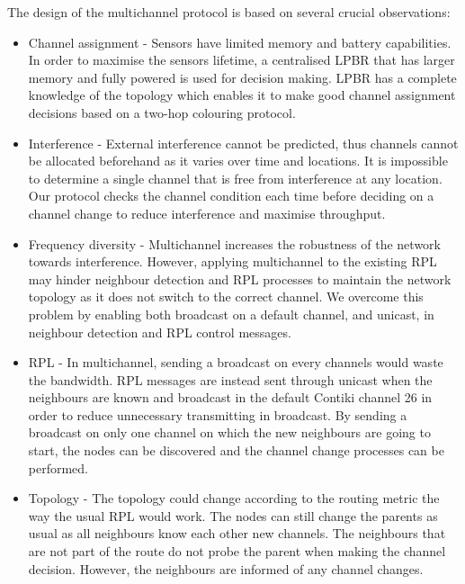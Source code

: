 The design of the multichannel protocol is based on several crucial observations:
\begin{itemize}
\item Channel assignment - Sensors have limited memory and battery capabilities. In order to maximise the sensors lifetime, a centralised LPBR that has larger memory and fully powered is used for decision making. LPBR has a complete knowledge of the topology which enables it to make good channel assignment decisions based on a two-hop colouring protocol.

\item Interference - External interference cannot be predicted, thus channels cannot be allocated beforehand as it varies over time and locations. It is impossible to determine a single channel that is free from interference at any location. Our protocol checks the channel condition each time before deciding on a channel change to reduce interference and maximise throughput.

\item Frequency diversity - Multichannel increases the robustness of the network towards interference. However, applying multichannel to the existing RPL may hinder neighbour detection and RPL processes to maintain the network topology as it does not switch to the correct channel. We overcome this problem by enabling both broadcast on a default channel, and unicast, in neighbour detection and RPL control messages. 

\item RPL - In multichannel, sending a broadcast on every channels would waste the bandwidth. RPL messages are instead sent through unicast when the neighbours are known and broadcast in the default Contiki channel 26 in order to reduce unnecessary transmitting in broadcast. By sending a broadcast on only one channel on which the new neighbours are going to start, the nodes can be discovered and the channel change processes can be performed. 

\item Topology - The topology could change according to the routing metric the way the usual RPL would work. The nodes can still change the parents as usual as all neighbours know each other new channels. The neighbours that are not part of the route do not probe the parent when making the channel decision. However, the neighbours are informed of any channel changes.

\end{itemize}

